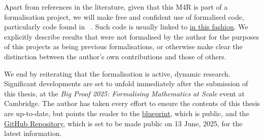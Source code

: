 Apart from references in the literature, given that this M4R is part of a formalisation project, we will make free and confident use of formalised code, particularly code found in \mathlib\ \cite{mathlib}. Such code is usually linked to \href{https://github.com/leanprover-community/mathlib4}{in this fashion}. We explicitly describe results that were not formalised by the author for the purposes of this projects as being previous formalisations, or otherwise make clear the distinction between the author's own contributions and those of others.

We end by reiterating that the formalisation is active, dynamic research. Significant developments are set to unfold immediately after the submission of this thesis, at the \textit{Big Proof 2025: Formalising Mathematics at Scale} event at Cambridge. The author has taken every effort to ensure the contents of this thesis are up-to-date, but points the reader to the \href{https://thefundamentaltheor3m.github.io/Sphere-Packing-Lean/blueprint/index.html}{blueprint}, which is public, and the \href{https://github.com/thefundamentaltheor3m/Sphere-Packing-Lean}{GitHub Repository}, which is set to be made public on 13 June, 2025, for the latest information.

\begin{comment}
    Given the limitations of the M4R assessed project paradigm, the author decided, at the very beginning, to use the first three sections of Viazovska's paper as a black box in order to reduce the number-theoretic burden on what already stood ahead of me as a daunting formalisation task. In particular, the author chose not to make this M4R a number theory project with an element of formalisation but a formalisation project involving ideas from number theory and complex analysis. This conscious but deliberate decision illustrates one of the many advantages of formal theorem proving: modularity with assurances. That is, one need not understand the entirety of a project to contribute to it: one simply needs to understand the parts one is formalising and how to use other ideas and results to one's end. In particular, the fact that the results one is using are formalised provides one with the assurance (that would otherwise only come with expertise) that those results are, indeed, correct. By bearing in mind the subtle yet immensely important fact that this project, at its core, is not a number theory project but a formalisation project, the reader will better understand the expository choices made by the author over the course of this report. There will be less emphasis on the motivations for constructing Viazovska's magic function in this manner (for there exist numerous excellent expository articles that explain this in detail \cite{a few things}) and more emphasis on the formalisation process, with reflections on the successes and failures of the formalisation strategies employed. We underscore insights gleaned from doing this that were not evident in the paper, one one occasion even identifying a small (but negligible) error that was published in the Annals. 
\end{comment}
